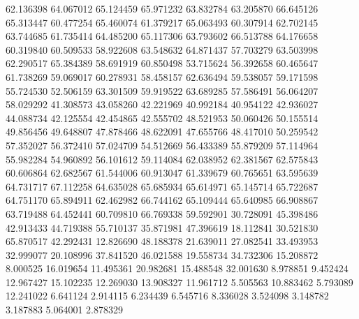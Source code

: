 62.136398
64.067012
65.124459
65.971232
63.832784
63.205870
66.645126
65.313447
60.477254
65.460074
61.379217
65.063493
60.307914
62.702145
63.744685
61.735414
64.485200
65.117306
63.793602
66.513788
64.176658
60.319840
60.509533
58.922608
63.548632
64.871437
57.703279
63.503998
62.290517
65.384389
58.691919
60.850498
53.715624
56.392658
60.465647
61.738269
59.069017
60.278931
58.458157
62.636494
59.538057
59.171598
55.724530
52.506159
63.301509
59.919522
63.689285
57.586491
56.064207
58.029292
41.308573
43.058260
42.221969
40.992184
40.954122
42.936027
44.088734
42.125554
42.454865
42.555702
48.521953
50.060426
50.155514
49.856456
49.648807
47.878466
48.622091
47.655766
48.417010
50.259542
57.352027
56.372410
57.024709
54.512669
56.433389
55.879209
57.114964
55.982284
54.960892
56.101612
59.114084
62.038952
62.381567
62.575843
60.606864
62.682567
61.544006
60.913047
61.339679
60.765651
63.595639
64.731717
67.112258
64.635028
65.685934
65.614971
65.145714
65.722687
64.751170
65.894911
62.462982
66.744162
65.109444
65.640985
66.908867
63.719488
64.452441
60.709810
66.769338
59.592901
30.728091
45.398486
42.913433
44.719388
55.710137
35.871981
47.396619
18.112841
30.521830
65.870517
42.292431
12.826690
48.188378
21.639011
27.082541
33.493953
32.999077
20.108996
37.841520
46.021588
19.558734
34.732306
15.208872
8.000525
16.019654
11.495361
20.982681
15.488548
32.001630
8.978851
9.452424
12.967427
15.102235
12.269030
13.908327
11.961712
5.505563
10.883462
5.793089
12.241022
6.641124
2.914115
6.234439
6.545716
8.336028
3.524098
3.148782
3.187883
5.064001
2.878329
